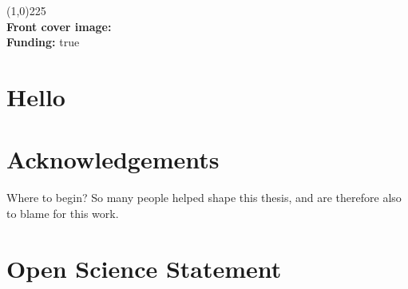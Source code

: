 \documentclass[
  letterpaper,
]{book}
\renewcommand*\contentsname{Table of contents}
\newcommand\contentsname{Table of contents}
\begin{document}
\begingroup
\hspace{0.000001cm}
\vfill
\begin{flushleft}
\line(1,0){225} \\ %
\textbf{Front cover image:}  \\[0.5cm]
\textbf{Funding:} true 
\end{flushleft}
\endgroup

\frontmatter
\maketitle

\ifdefined\Shaded\renewenvironment{Shaded}{\begin{tcolorbox}[frame hidden, breakable, boxrule=0pt, enhanced, borderline west={3pt}{0pt}{shadecolor}, sharp corners, interior hidden]}{\end{tcolorbox}}\fi

\renewcommand*\contentsname{Table of contents}
{
\setcounter{tocdepth}{2}
\tableofcontents
}
\listoffigures
\listoftables
\mainmatter
{}

\hypertarget{hello}{%
\chapter*{Hello}\label{hello}}


\frontmatter


\hypertarget{acknowledgements}{%
\chapter*{Acknowledgements}\label{acknowledgements}}


Where to begin? So many people helped shape this thesis, and are
therefore also to blame for this work.


\hypertarget{open-science-statement}{%
\chapter*{Open Science Statement}\label{open-science-statement}}
\end{document}
